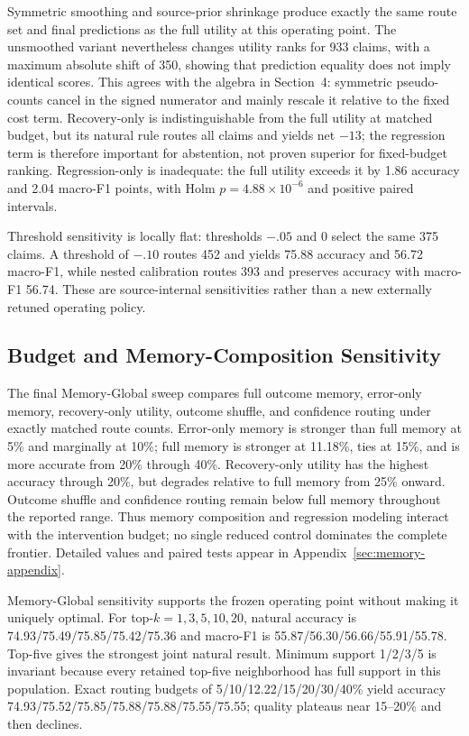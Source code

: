 \documentclass[runningheads]{llncs}
\begin{document}
Symmetric smoothing and source-prior shrinkage produce exactly the same route
set and final predictions as the full utility at this operating point. The
unsmoothed variant nevertheless
changes utility ranks for 933 claims, with a maximum absolute shift of 350,
showing that prediction equality does not imply identical scores. This agrees
with the algebra in Section~4: symmetric pseudo-counts cancel in the signed
numerator and mainly rescale it relative to the fixed cost term. Recovery-only
is indistinguishable from the full utility at matched budget, but its natural rule routes
all claims and yields net $-13$; the regression term is therefore important
for abstention, not proven superior for fixed-budget ranking. Regression-only
is inadequate: the full utility exceeds it by 1.86 accuracy and 2.04 macro-F1 points, with
Holm $p=4.88\times10^{-6}$ and positive paired intervals.

Threshold sensitivity is locally flat: thresholds $-.05$ and $0$ select the
same 375 claims. A threshold of $-.10$ routes 452 and yields 75.88 accuracy and
56.72 macro-F1, while nested calibration routes 393 and preserves accuracy
with macro-F1 56.74. These are source-internal sensitivities rather than a new
externally retuned operating policy.

\subsection{Budget and Memory-Composition Sensitivity}

The final Memory-Global sweep compares full outcome memory, error-only memory,
recovery-only utility, outcome shuffle, and confidence routing under exactly
matched route counts. Error-only memory is stronger than full memory at 5\%
and marginally at 10\%; full memory is stronger at 11.18\%, ties at 15\%, and
is more accurate from 20\% through 40\%. Recovery-only utility has the highest
accuracy through 20\%, but degrades relative to full memory from 25\% onward.
Outcome shuffle and confidence routing remain below full memory throughout the
reported range. Thus memory composition and regression modeling interact with
the intervention budget; no single reduced control dominates the complete
frontier. Detailed values and paired tests appear in
Appendix~\ref{sec:memory-appendix}.

Memory-Global sensitivity supports the frozen operating point without making it
uniquely optimal. For top-$k=1,3,5,10,20$, natural accuracy is
74.93/75.49/75.85/75.42/75.36 and macro-F1 is
55.87/56.30/56.66/55.91/55.78. Top-five gives the strongest joint natural
result. Minimum support 1/2/3/5 is invariant because every retained top-five
neighborhood has full support in this population. Exact routing budgets of
5/10/12.22/15/20/30/40\% yield accuracy
74.93/75.52/75.85/75.88/75.88/75.55/75.55; quality plateaus near 15--20\%
and then declines.
\end{document}
